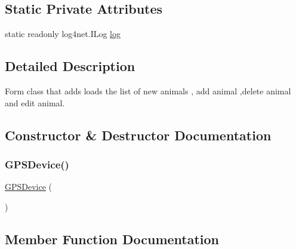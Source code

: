 \subsection*{Static Private Attributes}
\begin{DoxyCompactItemize}
\item 
static readonly log4net.\+I\+Log \hyperlink{classWildlifeTrackingApp_1_1GPSDevice_ae6c6142b8525b2f4ac6ee6e003b3106f}{log}
\end{DoxyCompactItemize}


\subsection{Detailed Description}
Form class that adds loads the list of new animals , add animal ,delete animal and edit animal. 



\subsection{Constructor \& Destructor Documentation}
\mbox{\label{classWildlifeTrackingApp_1_1GPSDevice_a4642693badcba7273e5031b821d3656c}} 
\subsubsection{\texorpdfstring{G\+P\+S\+Device()}{GPSDevice()}}
{\footnotesize\ttfamily \hyperlink{classWildlifeTrackingApp_1_1GPSDevice}{G\+P\+S\+Device} (\begin{DoxyParamCaption}{ }\end{DoxyParamCaption})\hspace{0.3cm}{\ttfamily [inline]}}



\subsection{Member Function Documentation}
\mbox{\label{classWildlifeTrackingApp_1_1GPSDevice_ae56b21bee08f5cad9858a264ccc21fd5}} 
